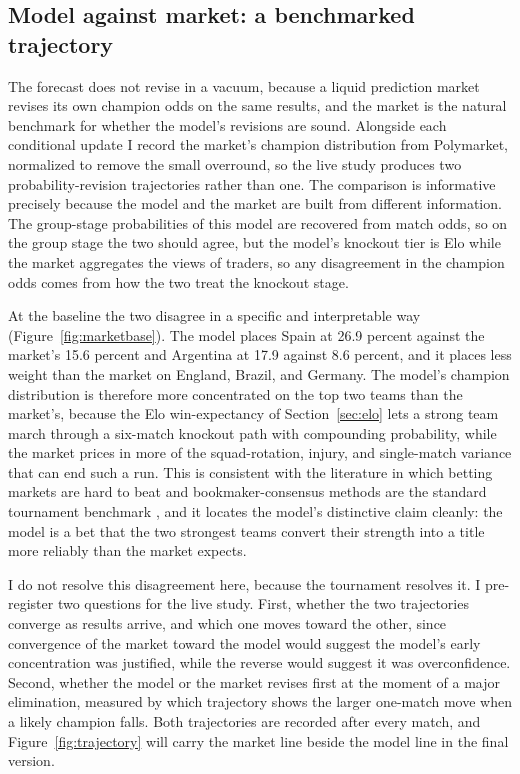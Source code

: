 \documentclass[11pt,letterpaper]{article}
\begin{document}
\subsection{Model against market: a benchmarked trajectory}\label{sec:market}

The forecast does not revise in a vacuum, because a liquid prediction market revises its own champion odds on the same results, and the market is the natural benchmark for whether the model's revisions are sound. Alongside each conditional update I record the market's champion distribution from Polymarket, normalized to remove the small overround, so the live study produces two probability-revision trajectories rather than one. The comparison is informative precisely because the model and the market are built from different information. The group-stage probabilities of this model are recovered from match odds, so on the group stage the two should agree, but the model's knockout tier is Elo while the market aggregates the views of traders, so any disagreement in the champion odds comes from how the two treat the knockout stage.

At the baseline the two disagree in a specific and interpretable way (Figure~\ref{fig:marketbase}). The model places Spain at 26.9 percent against the market's 15.6 percent and Argentina at 17.9 against 8.6 percent, and it places less weight than the market on England, Brazil, and Germany. The model's champion distribution is therefore more concentrated on the top two teams than the market's, because the Elo win-expectancy of Section~\ref{sec:elo} lets a strong team march through a six-match knockout path with compounding probability, while the market prices in more of the squad-rotation, injury, and single-match variance that can end such a run. This is consistent with the literature in which betting markets are hard to beat \citep{strumbelj2014, hvattum2010} and bookmaker-consensus methods are the standard tournament benchmark \citep{zeileis2018}, and it locates the model's distinctive claim cleanly: the model is a bet that the two strongest teams convert their strength into a title more reliably than the market expects.

I do not resolve this disagreement here, because the tournament resolves it. I pre-register two questions for the live study. First, whether the two trajectories converge as results arrive, and which one moves toward the other, since convergence of the market toward the model would suggest the model's early concentration was justified, while the reverse would suggest it was overconfidence. Second, whether the model or the market revises first at the moment of a major elimination, measured by which trajectory shows the larger one-match move when a likely champion falls. Both trajectories are recorded after every match, and Figure~\ref{fig:trajectory} will carry the market line beside the model line in the final version.
\end{document}

